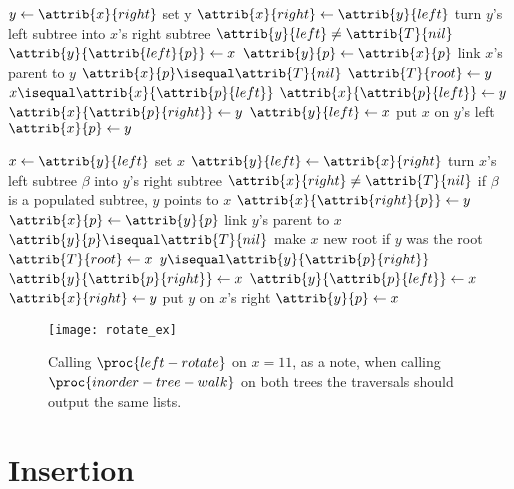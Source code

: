 \documentclass{article}
\begin{document}
\begin{codebox}
\li $y \gets{\attrib{x}{right}}$ \Comment set y
\li $\attrib{x}{right} \gets{\attrib{y}{left}}$ \Comment turn $y$'s left subtree into $x$'s right subtree
\li \If $\attrib{y}{left} \neq \attrib{T}{nil}$
\li \Then
        $\attrib{y}{\attrib{left}{p}} \gets{x}$
    \End
\li $\attrib{y}{p} \gets{\attrib{x}{p}}$ \Comment link $x$'s parent to $y$
\li \If $\attrib{x}{p} \isequal \attrib{T}{nil}$
\li \Then
        $\attrib{T}{root} \gets{y}$
\li \ElseIf $x \isequal \attrib{x}{\attrib{p}{left}}$
\li \Then
        $\attrib{x}{\attrib{p}{left}} \gets{y}$
\li \Else
\li     $\attrib{x}{\attrib{p}{right}} \gets{y}$
    \End
\li $\attrib{y}{left} \gets{x}$ \Comment put $x$ on $y$'s left
\li $\attrib{x}{p} \gets{y}$
\end{codebox}

\begin{codebox}
\li $x \gets{\attrib{y}{left}}$ \Comment set $x$
\li $\attrib{y}{left} \gets{\attrib{x}{right}}$ \Comment turn $x$'s left subtree $\beta$ into $y$'s right subtree
\li \If $\attrib{x}{right} \neq \attrib{T}{nil}$ \Comment if $\beta$ is a populated subtree, $y$ points to $x$
\li \Then
        $\attrib{x}{\attrib{right}{p}} \gets{y}$
    \End
\li $\attrib{x}{p} \gets{\attrib{y}{p}}$ \Comment link $y$'s parent to $x$
\li \If $\attrib{y}{p} \isequal \attrib{T}{nil}$ \Comment make $x$ new root if $y$ was the root
\li \Then
        $\attrib{T}{root} \gets{x}$
\li \ElseIf $y \isequal \attrib{y}{\attrib{p}{right}}$
\li \Then
        $\attrib{y}{\attrib{p}{right}} \gets{x}$
\li \Else
\li     $\attrib{y}{\attrib{p}{left}} \gets{x}$
    \End
\li $\attrib{x}{right} \gets{y}$ \Comment put $y$ on $x$'s right
\li $\attrib{y}{p} \gets{x}$
\end{codebox}

\begin{figure}[!ht]
\texttt{[image: rotate\_ex]}
\caption{
    Calling $\proc{left-rotate}$ on $x=11$, as a note, when calling $\proc{inorder-tree-walk}$ on both trees the traversals should output the same lists.
}
\label{fig: rbt3}
\end{figure}

\newpage

\section*{Insertion}
\end{document}
